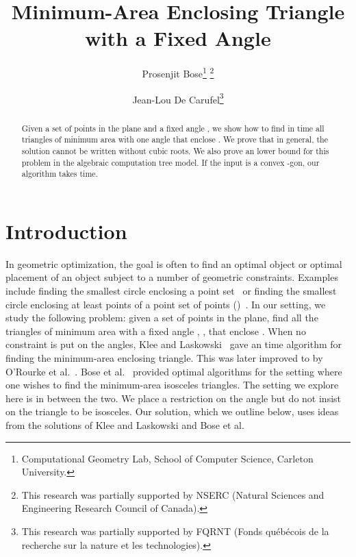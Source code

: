 \documentclass[11pt, oneside]{article}
\newcommand*\samethanks[1][\value{footnote}]{\footnotemark[#1]}
\begin{document}
\newtheorem{problem}{Problem}
\newtheorem{definition}[problem]{Definition}
\newtheorem{proposition}[problem]{Proposition}
\newtheorem{corollary}[problem]{Corollary}
\newtheorem{remark}[problem]{Remark}
\newtheorem{lemma}[problem]{Lemma}
\newtheorem{algorithm}[problem]{Algorithm}




\title{Minimum-Area Enclosing Triangle with a Fixed Angle}
\author{Prosenjit Bose\thanks{Computational Geometry Lab, School of Computer Science, Carleton University.} \thanks{This research was partially supported by NSERC (Natural Sciences and Engineering
Research Council of Canada).}
\and Jean-Lou De Carufel\samethanks[1] \thanks{This research was partially supported by FQRNT (Fonds qu\'{e}b\'{e}cois de la recherche sur la
nature et les technologies).} }


\maketitle

\begin{abstract}
Given a set  of  points in the plane and a fixed angle , 
we show how to find in  time
all triangles of minimum area with one angle  
that enclose .
We prove that in general,
the solution cannot be written without cubic roots.
We also prove an  lower bound for this problem
in the algebraic computation tree model.
If the input is a convex -gon,
our algorithm takes  time.
\end{abstract}




\section{Introduction}
\label{section introduction}


In geometric optimization, 
the goal is often to find an optimal object 
or optimal placement of an object 
subject to a number of geometric constraints.
Examples include finding the smallest circle 
enclosing a point set~\cite{DBLP:journals/siamcomp/Megiddo83a,Welzl91smallestenclosing}
or finding the smallest circle
enclosing at least  points of a point set of  points
()~\cite{DBLP:journals/comgeo/EfratSZ94,DBLP:journals/ipl/Matousek95}.
In our setting, 
we study the following problem: 
given a set  of  points in the plane, 
find all the triangles of minimum area 
with a fixed angle , 
, 
that enclose .
When no constraint is put on the angles,
Klee and Laskowski~\cite{DBLP:journals/jal/KleeL85} 
gave an  time algorithm 
for finding the minimum-area enclosing triangle. 
This was later improved to  
by O'Rourke et al.~\cite{DBLP:journals/jal/ORourkeAMB86}.
Bose et al.~\cite{DBLP:journals/ijcga/BoseMSS11} 
provided optimal algorithms for the setting where 
one wishes to find the minimum-area isosceles triangles. 
The setting we explore here is in between the two. 
We place a restriction on the angle 
but do not insist on the triangle to be isosceles. 
Our solution, 
which we outline below,
uses ideas from the solutions of Klee and Laskowski
and Bose et al.
\end{document}
